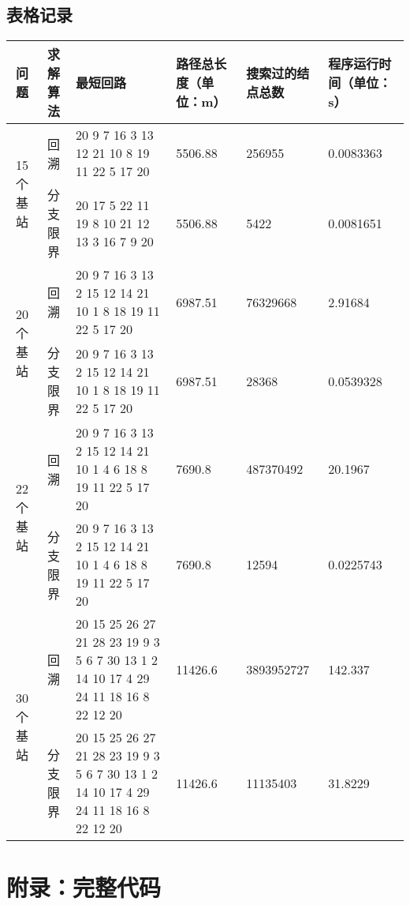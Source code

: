 \documentclass[lang=cn,11pt,a4paper]{elegantpaper}
\begin{document}
\subsection{表格记录}
\begin{longtable}{|c|c|m{2.5cm}|m{2cm}|m{2cm}|m{2cm}|}
    \hline
    问题 &  求解算法 & 最短回路 & 路径总长度（单位：m） & 搜索过的结点总数 & 程序运行时间（单位：s） \\
    \hline
    \multirow{2}{*}[-2.5ex]{\bigstrut 15个基站} & 回溯 & 20 9 7 16 3 13 12 21 10 8 19 11 22 5 17 20 & 5506.88 & 256955 & 0.0083363 \\
    \cline{2-6}
    & 分支限界 & 20 17 5 22 11 19 8 10 21 12 13 3 16 7 9 20 & 5506.88 & 5422 & 0.0081651 \\
    \hline
    \multirow{2}{*}[-4.5ex]{\bigstrut 20个基站} & 回溯 & 20 9 7 16 3 13 2 15 12 14 21 10 1 8 18 19 11 22 5 17 20 & 6987.51 & 76329668 & 2.91684 \\
    \cline{2-6}
    & 分支限界 & 20 9 7 16 3 13 2 15 12 14 21 10 1 8 18 19 11 22 5 17 20 & 6987.51 & 28368 & 0.0539328 \\
    \hline
    \multirow{2}{*}[-5.5ex]{\bigstrut 22个基站} & 回溯 & 20 9 7 16 3 13 2 15 12 14 21 10 1 4 6 18 8 19 11 22 5 17 20 & 7690.8 & 487370492 & 20.1967 \\
    \cline{2-6}
    & 分支限界 & 20 9 7 16 3 13 2 15 12 14 21 10 1 4 6 18 8 19 11 22 5 17 20 & 7690.8 & 12594 & 0.0225743 \\
    \hline
    \multirow{2}{*}[-8.5ex]{\bigstrut 30个基站} & 回溯 & 20 15 25 26 27 21 28 23 19 9 3 5 6 7 30 13 1 2 14 10 17 4 29 24 11 18 16 8 22 12 20 & 11426.6 & 3893952727 & 142.337 \\
    \cline{2-6}
    & 分支限界 & 20 15 25 26 27 21 28 23 19 9 3 5 6 7 30 13 1 2 14 10 17 4 29 24 11 18 16 8 22 12 20 & 11426.6 & 11135403 & 31.8229 \\
    \hline
\end{longtable}


\section{附录：完整代码}
\end{document}

